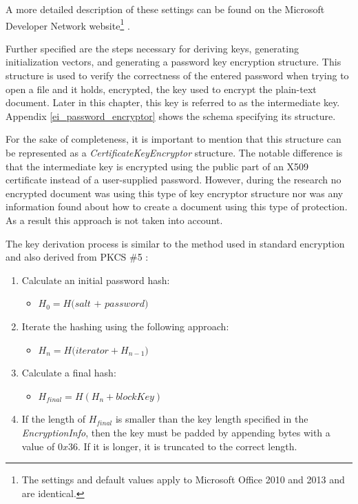 \documentclass[11pt,oneside]{fithesis2}
\begin{document}
A more detailed description of these settings can be found on the Microsoft Developer Network website\footnote{The settings and default values apply to Microsoft Office 2010 and 2013 and are identical.} \cite{plan_office_crypto}. 

Further specified are the steps necessary for deriving keys, generating initialization vectors, and generating a password key encryption structure. This structure is used to verify the correctness of the entered password when trying to open a file and it holds, encrypted, the key used to encrypt the plain-text document. Later in this chapter, this key is referred to as the intermediate key. Appendix \ref{ei_password_encryptor} shows the schema specifying its structure.

For the sake of completeness, it is important to mention that this structure can be represented as a \textit{CertificateKeyEncryptor} structure. The notable difference is that the intermediate key is encrypted using the public part of an X509 certificate instead of a user-supplied password. However, during the research no encrypted document was using this type of key encryptor structure nor was any information found about how to create a document using this type of protection. As a result this approach is not taken into account.

The key derivation process is similar to the method used in standard encryption and also derived from PKCS \#5 \cite{rfc2898}:

\begin{enumerate}
\item{Calculate an initial password hash:}
	\begin{itemize}
		\item{$H_0 =\textit{H(salt + password)}$}
	\end{itemize}
\item{Iterate the hashing using the following approach:}
	\begin{itemize}
		\item{$H_n = \textit{H(iterator} + H_{n-1})$}
	\end{itemize}
\item{Calculate a final hash:}
	\begin{itemize}
		\item{$H_{final} = \textit{H}(H_n + blockKey)$}
	\end{itemize}
\item{If the length of $H_{final}$ is smaller than the key length specified in the \textit{EncryptionInfo}, then the key must be padded by appending bytes with a value of $0x36$. If it is longer, it is truncated to the correct length.}
\end{enumerate}
\end{document}
